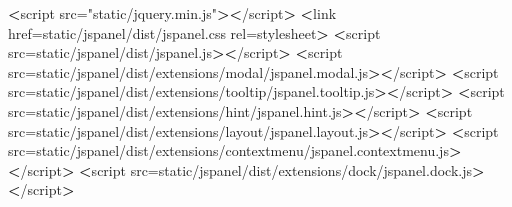 \documentclass[
]{article}
\newenvironment{Shaded}{\begin{snugshade}}{\end{snugshade}}
\newcommand{\NormalTok}[1]{#1}
\newcommand{\OperatorTok}[1]{\textcolor[rgb]{0.81,0.36,0.00}{\textbf{#1}}}
\newcommand{\StringTok}[1]{\textcolor[rgb]{0.31,0.60,0.02}{#1}}
\newcommand{\VariableTok}[1]{\textcolor[rgb]{0.00,0.00,0.00}{#1}}
\begin{document}
\begin{Shaded}
\begin{Highlighting}[]
\OperatorTok{\textless{}}\NormalTok{script }\VariableTok{src=}\StringTok{"static/jquery.min.js"}\OperatorTok{\textgreater{}\textless{}}\NormalTok{/script}\OperatorTok{\textgreater{}}
\OperatorTok{\textless{}}\NormalTok{link }\VariableTok{href=}\StringTok{\textquotesingle{}static/jspanel/dist/jspanel.css\textquotesingle{}} \VariableTok{rel=}\StringTok{\textquotesingle{}stylesheet\textquotesingle{}}\OperatorTok{\textgreater{}}
\OperatorTok{\textless{}}\NormalTok{script }\VariableTok{src=}\StringTok{\textquotesingle{}static/jspanel/dist/jspanel.js\textquotesingle{}}\OperatorTok{\textgreater{}\textless{}}\NormalTok{/script}\OperatorTok{\textgreater{}}
\OperatorTok{\textless{}}\NormalTok{script }\VariableTok{src=}\StringTok{\textquotesingle{}static/jspanel/dist/extensions/modal/jspanel.modal.js\textquotesingle{}}\OperatorTok{\textgreater{}\textless{}}\NormalTok{/script}\OperatorTok{\textgreater{}}
\OperatorTok{\textless{}}\NormalTok{script }\VariableTok{src=}\StringTok{\textquotesingle{}static/jspanel/dist/extensions/tooltip/jspanel.tooltip.js\textquotesingle{}}\OperatorTok{\textgreater{}\textless{}}\NormalTok{/script}\OperatorTok{\textgreater{}}
\OperatorTok{\textless{}}\NormalTok{script }\VariableTok{src=}\StringTok{\textquotesingle{}static/jspanel/dist/extensions/hint/jspanel.hint.js\textquotesingle{}}\OperatorTok{\textgreater{}\textless{}}\NormalTok{/script}\OperatorTok{\textgreater{}}
\OperatorTok{\textless{}}\NormalTok{script }\VariableTok{src=}\StringTok{\textquotesingle{}static/jspanel/dist/extensions/layout/jspanel.layout.js\textquotesingle{}}\OperatorTok{\textgreater{}\textless{}}\NormalTok{/script}\OperatorTok{\textgreater{}}
\OperatorTok{\textless{}}\NormalTok{script }\VariableTok{src=}\StringTok{\textquotesingle{}static/jspanel/dist/extensions/contextmenu/jspanel.contextmenu.js\textquotesingle{}}\OperatorTok{\textgreater{}\textless{}}\NormalTok{/script}\OperatorTok{\textgreater{}}
\OperatorTok{\textless{}}\NormalTok{script }\VariableTok{src=}\StringTok{\textquotesingle{}static/jspanel/dist/extensions/dock/jspanel.dock.js\textquotesingle{}}\OperatorTok{\textgreater{}\textless{}}\NormalTok{/script}\OperatorTok{\textgreater{}}
\end{Highlighting}
\end{Shaded}
\end{document}
